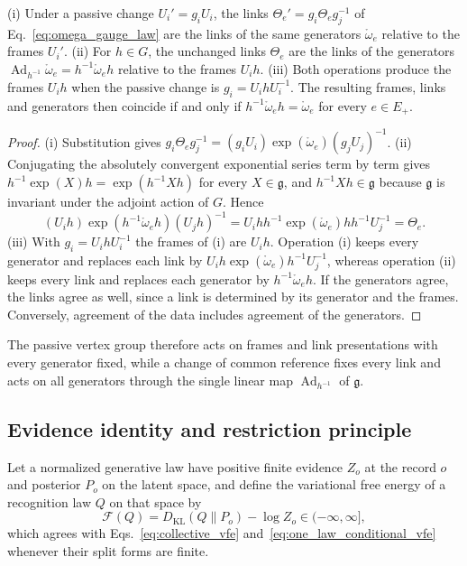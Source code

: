 \begin{lemma}\label{lem:sp_generator_gauge}
(i) Under a passive change $U_i'=g_iU_i$, the links $\Theta_e'=g_i\Theta_eg_j^{-1}$ of Eq.~\eqref{eq:omega_gauge_law} are the links of the same generators $\mathring\omega_e$ relative to the frames $U_i'$.
(ii) For $h\in G$, the unchanged links $\Theta_e$ are the links of the generators $\operatorname{Ad}_{h^{-1}}\mathring\omega_e=h^{-1}\mathring\omega_eh$ relative to the frames $U_ih$.
(iii) Both operations produce the frames $U_ih$ when the passive change is $g_i=U_ihU_i^{-1}$. The resulting frames, links and generators then coincide if and only if $h^{-1}\mathring\omega_eh=\mathring\omega_e$ for every $e\in E_+$.
\end{lemma}
\begin{proof}
(i) Substitution gives $g_i\Theta_eg_j^{-1}=(g_iU_i)\exp(\mathring\omega_e)(g_jU_j)^{-1}$.
(ii) Conjugating the absolutely convergent exponential series term by term gives $h^{-1}\exp(X)h=\exp(h^{-1}Xh)$ for every $X\in\mathfrak g$, and $h^{-1}Xh\in\mathfrak g$ because $\mathfrak g$ is invariant under the adjoint action of $G$. Hence
\begin{equation*}
(U_ih)\exp(h^{-1}\mathring\omega_eh)(U_jh)^{-1}
=U_ihh^{-1}\exp(\mathring\omega_e)hh^{-1}U_j^{-1}=\Theta_e.
\end{equation*}
(iii) With $g_i=U_ihU_i^{-1}$ the frames of (i) are $U_ih$. Operation (i) keeps every generator and replaces each link by $U_ih\exp(\mathring\omega_e)h^{-1}U_j^{-1}$, whereas operation (ii) keeps every link and replaces each generator by $h^{-1}\mathring\omega_eh$. If the generators agree, the links agree as well, since a link is determined by its generator and the frames. Conversely, agreement of the data includes agreement of the generators.
\end{proof}
The passive vertex group therefore acts on frames and link presentations with every generator fixed, while a change of common reference fixes every link and acts on all generators through the single linear map $\operatorname{Ad}_{h^{-1}}$ of $\mathfrak g$.

\subsection{Evidence identity and restriction principle}\label{app:sp_restriction}
Let a normalized generative law have positive finite evidence $Z_o$ at the record $o$ and posterior $P_o$ on the latent space, and define the variational free energy of a recognition law $Q$ on that space by
\begin{equation}
\mathcal F(Q)=D_{\mathrm{KL}}(Q\|P_o)-\log Z_o\in(-\infty,\infty],
\label{eq:sp_extended_vfe}
\end{equation}
which agrees with Eqs.~\eqref{eq:collective_vfe} and~\eqref{eq:one_law_conditional_vfe} whenever their split forms are finite.

